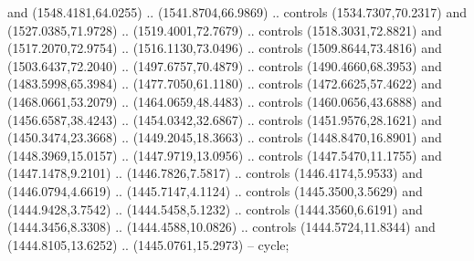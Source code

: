 \begin{scope}[shift={(19.44451,-318.97965)}]
\begin{scope}[shift={(-2093.8013,-1176.4989)}]
\begin{scope}
\begin{scope}
\begin{scope}[shift={(1261.8671,1726.9965)}]
            and (1548.4181,64.0255) .. (1541.8704,66.9869) .. controls (1534.7307,70.2317)
            and (1527.0385,71.9728) .. (1519.4001,72.7679) .. controls (1518.3031,72.8821)
            and (1517.2070,72.9754) .. (1516.1130,73.0496) .. controls (1509.8644,73.4816)
            and (1503.6437,72.2040) .. (1497.6757,70.4879) .. controls (1490.4660,68.3953)
            and (1483.5998,65.3984) .. (1477.7050,61.1180) .. controls (1472.6625,57.4622)
            and (1468.0661,53.2079) .. (1464.0659,48.4483) .. controls (1460.0656,43.6888)
            and (1456.6587,38.4243) .. (1454.0342,32.6867) .. controls (1451.9576,28.1621)
            and (1450.3474,23.3668) .. (1449.2045,18.3663) .. controls (1448.8470,16.8901)
            and (1448.3969,15.0157) .. (1447.9719,13.0956) .. controls (1447.5470,11.1755)
            and (1447.1478,9.2101) .. (1446.7826,7.5817) .. controls (1446.4174,5.9533)
            and (1446.0794,4.6619) .. (1445.7147,4.1124) .. controls (1445.3500,3.5629)
            and (1444.9428,3.7542) .. (1444.5458,5.1232) .. controls (1444.3560,6.6191)
            and (1444.3456,8.3308) .. (1444.4588,10.0826) .. controls (1444.5724,11.8344)
            and (1444.8105,13.6252) .. (1445.0761,15.2973) -- cycle;


\end{scope}
\end{scope}
\end{scope}
\end{scope}
\end{scope}
